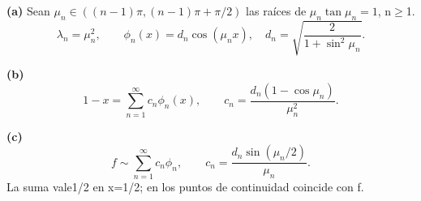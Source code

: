\noindent\textbf{(a)} Sean \(\mu_n\in((n-1)\pi,(n-1)\pi+\pi/2)\) las raíces de \(\mu_n\tan\mu_n=1\), n\ensuremath{\ge}1.
\[\lambda_n=\mu_n^2,\qquad \phi_n(x)=d_n\cos(\mu_nx),\quad d_n=\sqrt{\frac2{1+\sin^2\mu_n}}.\]

\noindent\textbf{(b)} \[1-x=\sum_{n=1}^{\infty}c_n\phi_n(x),\qquad
c_n=\frac{d_n(1-\cos\mu_n)}{\mu_n^2}.\]

\noindent\textbf{(c)} \[f\sim\sum_{n=1}^{\infty}c_n\phi_n,\qquad
c_n=\frac{d_n\sin(\mu_n/2)}{\mu_n}.\]
La suma vale1/2 en x=1/2; en los puntos de continuidad coincide con f.
